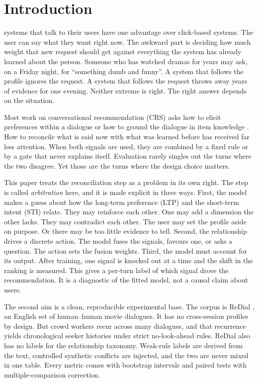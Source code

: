 \IEEEpeerreviewmaketitle

\section{Introduction}
 systems that talk to their users have one advantage over click-based systems. The user can say what they want right now. The awkward part is deciding how much weight that new request should get against everything the system has already learned about the person. Someone who has watched dramas for years may ask, on a Friday night, for ``something dumb and funny''. A system that follows the profile ignores the request. A system that follows the request throws away years of evidence for one evening. Neither extreme is right. The right answer depends on the situation.

Most work on conversational recommendation (CRS) asks how to elicit preferences within a dialogue \cite{christakopoulou2016towards,sun2018crm,lei2020ear,zhang2018conversational} or how to ground the dialogue in item knowledge \cite{chen2019kbrd,zhou2020kgsf}. How to reconcile what is said now with what was learned before has received far less attention. When both signals are used, they are combined by a fixed rule or by a gate that never explains itself. Evaluation rarely singles out the turns where the two disagree. Yet those are the turns where the design choice matters.

This paper treats the reconciliation step as a problem in its own right. The step is called \emph{arbitration} here, and it is made explicit in three ways. First, the model makes a guess about how the long-term preference (LTP) and the short-term intent (STI) relate. They may reinforce each other. One may add a dimension the other lacks. They may contradict each other. The user may set the profile aside on purpose. Or there may be too little evidence to tell. Second, the relationship drives a discrete action. The model fuses the signals, favours one, or asks a question. The action sets the fusion weights. Third, the model must account for its output. After training, one signal is knocked out at a time and the shift in the ranking is measured. This gives a per-turn label of which signal drove the recommendation. It is a diagnostic of the fitted model, not a causal claim about users.

The second aim is a clean, reproducible experimental base. The corpus is ReDial \cite{li2018redial}, an English set of human--human movie dialogues. It has no cross-session profiles by design. But crowd workers recur across many dialogues, and that recurrence yields chronological seeker histories under strict no-look-ahead rules. ReDial also has no labels for the relationship taxonomy. Weak-rule labels are derived from the text, controlled synthetic conflicts are injected, and the two are never mixed in one table. Every metric comes with bootstrap intervals and paired tests with multiple-comparison correction.


